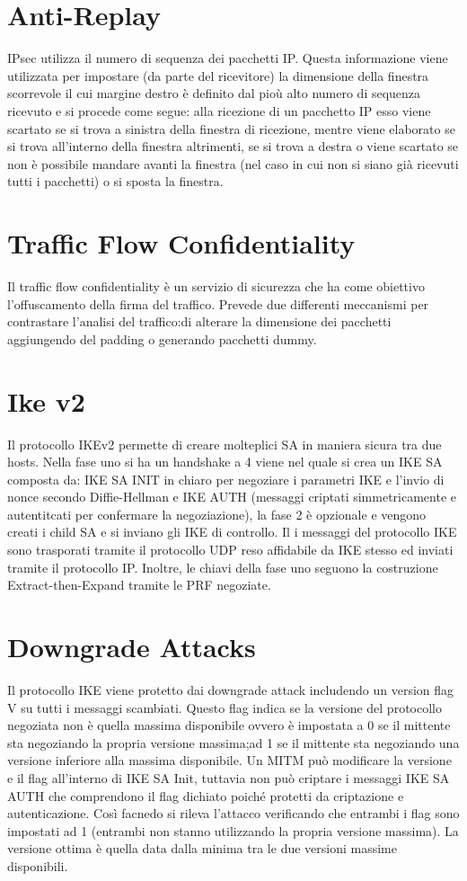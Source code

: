 \documentclass[a4paper,draft]{article}
\begin{document}
\section{Anti-Replay}
IPsec utilizza il numero di sequenza dei pacchetti IP\@. Questa informazione viene utilizzata per impostare (da parte del ricevitore) la dimensione della finestra scorrevole il cui margine destro è definito dal pioù alto numero di sequenza ricevuto e si procede come segue: alla ricezione di un pacchetto IP esso viene scartato se si trova a sinistra della finestra di ricezione, mentre viene elaborato se si trova all'interno della finestra altrimenti, se si trova a destra o viene scartato se non è possibile mandare avanti la finestra (nel caso in cui non si siano già ricevuti tutti i pacchetti) o si sposta la finestra\@.
\section{Traffic Flow Confidentiality}
Il traffic flow confidentiality è un servizio di sicurezza che ha come obiettivo l'offuscamento della firma del traffico\@. Prevede due differenti meccanismi per contrastare l'analisi del traffico: di alterare la dimensione dei pacchetti aggiungendo del padding o generando pacchetti dummy\@.
\section{Ike v2}
Il protocollo IKEv2 permette di creare molteplici SA in maniera sicura tra due hosts\@. Nella fase uno si ha un handshake a 4 viene nel quale si crea un IKE SA composta da: IKE SA INIT in chiaro per negoziare i parametri IKE e l'invio di nonce secondo Diffie-Hellman e IKE AUTH (messaggi criptati simmetricamente e autentitcati per confermare la negoziazione), la fase 2 è opzionale e vengono creati i child SA e si inviano gli IKE di controllo\@.\newline
Il i messaggi del protocollo IKE sono trasporati tramite il protocollo UDP reso affidabile da IKE stesso ed inviati tramite il protocollo IP\@. \newline
Inoltre, le chiavi della fase uno seguono la costruzione Extract-then-Expand tramite le PRF negoziate.
\section{Downgrade Attacks}
Il protocollo IKE viene protetto dai downgrade attack includendo un version flag V su tutti i messaggi scambiati\@. Questo flag indica se la versione del protocollo negoziata non è quella massima disponibile ovvero è impostata a 0 se il mittente sta negoziando la propria versione massima;\@altrimenti ad 1 se il mittente sta negoziando una versione inferiore alla massima disponibile\@.\newline
Un MITM può modificare la versione e il flag all'interno di IKE SA Init, tuttavia non può criptare i messaggi IKE SA AUTH che comprendono il flag dichiato poiché protetti da criptazione e autenticazione\@. Così facnedo si rileva l'attacco verificando che entrambi i flag sono impostati ad 1 (entrambi non stanno utilizzando la propria versione massima)\@.\newline
La versione ottima è quella data dalla minima tra le due versioni massime disponibili\@.
\end{document}
